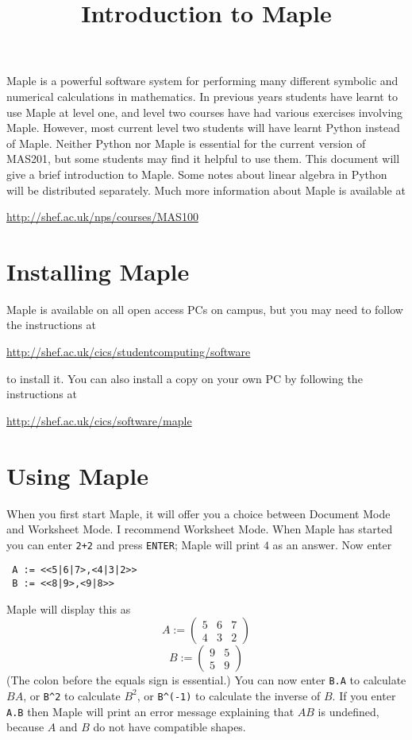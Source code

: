 \documentclass{amsart}
\title{Introduction to Maple}
\begin{document}
\maketitle

Maple is a powerful software system for performing many different
symbolic and numerical calculations in mathematics.  In previous years
students have learnt to use Maple at level one, and level two courses
have had various exercises involving Maple.  However, most current
level two students will have learnt Python instead of Maple. Neither
Python nor Maple is essential for the current version of MAS201, but
some students may find it helpful to use them.  This document will
give a brief introduction to Maple.  Some notes about linear algebra
in Python will be distributed separately.  Much more information about
Maple is available at 
\begin{center}
 \url{http://shef.ac.uk/nps/courses/MAS100}
\end{center}

\section*{Installing Maple}

Maple is available on all open access PCs on campus, but you may need
to follow the instructions at 
\begin{center}
 \url{http://shef.ac.uk/cics/studentcomputing/software}
\end{center}
to install it.  You can also install a copy on your own PC by
following the instructions at 
\begin{center}
 \url{http://shef.ac.uk/cics/software/maple}
\end{center}

\section*{Using Maple}

When you first start Maple, it will offer you a choice between
Document Mode and Worksheet Mode.  I recommend Worksheet Mode.  When
Maple has started you can enter \texttt{2+2} and press
\texttt{ENTER}; Maple will print $4$ as an answer.  Now enter
\begin{verbatim}
 A := <<5|6|7>,<4|3|2>>
 B := <<8|9>,<9|8>>
\end{verbatim}
Maple will display this as 
\[ A := 
   \begin{pmatrix}
    5 & 6 & 7 \\
    4 & 3 & 2 
   \end{pmatrix}
\]
\[ B := 
    \begin{pmatrix}
     9 & 5 \\ 5 & 9
    \end{pmatrix}
\]
(The colon before the equals sign is essential.)  You can now enter
\verb+B.A+ to calculate $BA$, or \verb+B^2+ to calculate $B^2$, or
\verb+B^(-1)+ to calculate the inverse of $B$.  If you enter
\verb+A.B+ then Maple will print an error message explaining that $AB$
is undefined, because $A$ and $B$ do not have compatible shapes.
\end{document}
